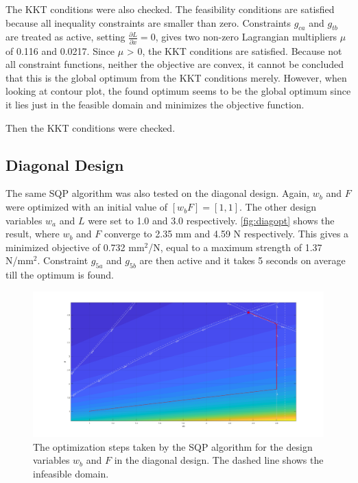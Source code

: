 The KKT conditions were also checked. The feasibility conditions are satisfied because all inequality constraints are smaller than zero. Constraints $g_{ca}$ and $g_{tb}$ are treated as active, setting $\frac{\partial L}{\partial x} = 0$, gives two non-zero Lagrangian multipliers $\mu$ of 0.116 and 0.0217. Since $\mu$ > 0, the KKT conditions are satisfied. Because not all constraint functions, neither the objective are convex, it cannot be concluded that this is the global optimum from the KKT conditions merely. However, when looking at contour plot, the found optimum seems to be the global optimum since it lies just in the feasible domain and minimizes the objective function. 

Then the KKT conditions were checked. 
\subsection{Diagonal Design}
The same SQP algorithm was also tested on the diagonal design. Again, $w_b$ and $F$ were optimized with an initial value of $[w_b F] = [1, 1]$. The other design variables $w_a$ and $L$ were set to 1.0 and 3.0 respectively. \autoref{fig:diagopt} shows the result, where $w_b$ and $F$ converge to 2.35 mm and 4.59 N respectively. This gives a minimized objective of 0.732 mm$^2$/N, equal to a maximum strength of 1.37 N/mm$^2$. Constraint $g_{5a}$ and $g_{5b}$ are then active and it takes 5 seconds on average till the optimum is found.


\begin{figure}[H]
	\centering
	\includegraphics[width=\columnwidth]{sources/plots/diagonal2var.png}
	\caption{The optimization steps taken by the SQP algorithm for the design variables $w_b$ and $F$ in the diagonal design. The dashed line shows the infeasible domain.}
	\label{fig:diagopt}
\end{figure}

